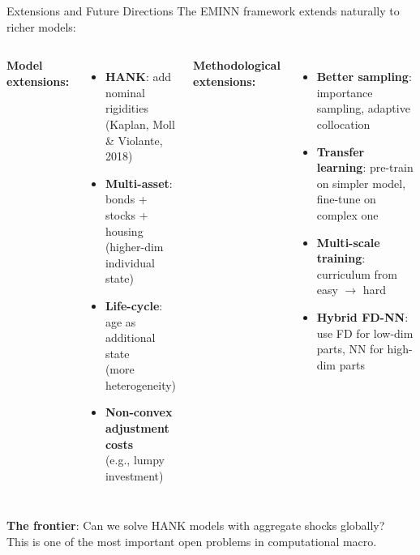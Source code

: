 \documentclass[aspectratio=169,11pt]{beamer}
\newcommand{\emphc}[1]{\textcolor{harvardcrimson}{#1}}
\begin{document}
\begin{frame}{Extensions and Future Directions}
\small
The EMINN framework extends naturally to richer models:

\vspace{0.2em}
\begin{columns}[T]
\textbf{Model extensions:}
\begin{itemize}\itemsep1pt
    \item \textbf{HANK}: add nominal rigidities\\
    {\small (Kaplan, Moll \& Violante, 2018)}
    \item \textbf{Multi-asset}: bonds + stocks + housing\\
    {\small (higher-dim individual state)}
    \item \textbf{Life-cycle}: age as additional state\\
    {\small (more heterogeneity)}
    \item \textbf{Non-convex adjustment costs}\\
    {\small (e.g., lumpy investment)}
\end{itemize}

\textbf{Methodological extensions:}
\begin{itemize}\itemsep1pt
    \item \textbf{Better sampling}: importance sampling, adaptive collocation
    \item \textbf{Transfer learning}: pre-train on simpler model, fine-tune on complex one
    \item \textbf{Multi-scale training}: curriculum from easy $\to$ hard
    \item \textbf{Hybrid FD-NN}: use FD for low-dim parts, NN for high-dim parts
\end{itemize}
\end{columns}

\vspace{0.3em}
\begin{center}
\colorbox{uzhgreylight}{\parbox{0.8\textwidth}{\centering\small
\textbf{The frontier}: Can we solve HANK models with aggregate shocks \emphc{globally}?\\
This is one of the most important open problems in computational macro.}}
\end{center}
\end{frame}
\end{document}

